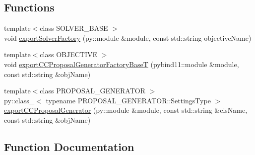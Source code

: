 \subsection*{Functions}
\begin{DoxyCompactItemize}
\item 
{\footnotesize template$<$class S\+O\+L\+V\+E\+R\+\_\+\+B\+A\+S\+E $>$ }\\void \hyperlink{namespacenifty_1_1graph_1_1optimization_1_1common_ac0f48d09affe67d7fdf71a7aa91a9c46}{export\+Solver\+Factory} (py\+::module \&module, const std\+::string objective\+Name)
\item 
{\footnotesize template$<$class O\+B\+J\+E\+C\+T\+I\+V\+E $>$ }\\void \hyperlink{namespacenifty_1_1graph_1_1optimization_1_1common_a78d8d2a3a62c60cc2117005e75609134}{export\+C\+C\+Proposal\+Generator\+Factory\+Base\+T} (pybind11\+::module \&module, const std\+::string \&obj\+Name)
\item 
{\footnotesize template$<$class P\+R\+O\+P\+O\+S\+A\+L\+\_\+\+G\+E\+N\+E\+R\+A\+T\+O\+R $>$ }\\py\+::class\+\_\+$<$ typename P\+R\+O\+P\+O\+S\+A\+L\+\_\+\+G\+E\+N\+E\+R\+A\+T\+O\+R\+::\+Settings\+Type $>$ \hyperlink{namespacenifty_1_1graph_1_1optimization_1_1common_a14cf355c5a6891f49b59948e759b8a50}{export\+C\+C\+Proposal\+Generator} (py\+::module \&module, const std\+::string \&cls\+Name, const std\+::string \&obj\+Name)
\end{DoxyCompactItemize}


\subsection{Function Documentation}
\hypertarget{namespacenifty_1_1graph_1_1optimization_1_1common_a14cf355c5a6891f49b59948e759b8a50}{}
